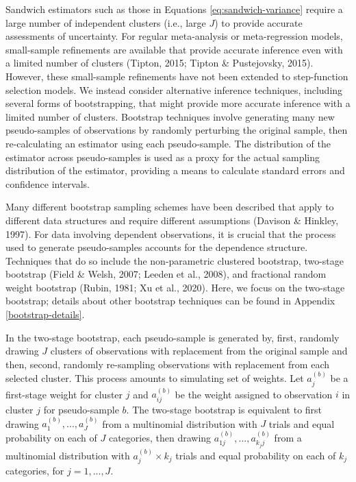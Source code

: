 \documentclass[
  american,
  man, donotrepeattitle,floatsintext]{apa7}
\begin{document}
Sandwich estimators such as those in Equations \eqref{eq:sandwich-variance} require a large number of independent clusters (i.e., large \(J\)) to provide accurate assessments of uncertainty.
For regular meta-analysis or meta-regression models, small-sample refinements are available that provide accurate inference even with a limited number of clusters (Tipton, 2015; Tipton \& Pustejovsky, 2015).
However, these small-sample refinements have not been extended to step-function selection models.
We instead consider alternative inference techniques, including several forms of bootstrapping, that might provide more accurate inference with a limited number of clusters.
Bootstrap techniques involve generating many new pseudo-samples of observations by randomly perturbing the original sample, then re-calculating an estimator using each pseudo-sample.
The distribution of the estimator across pseudo-samples is used as a proxy for the actual sampling distribution of the estimator, providing a means to calculate standard errors and confidence intervals.

Many different bootstrap sampling schemes have been described that apply to different data structures and require different assumptions (Davison \& Hinkley, 1997).
For data involving dependent observations, it is crucial that the process used to generate pseudo-samples accounts for the dependence structure.
Techniques that do so include the non-parametric clustered bootstrap, two-stage bootstrap (Field \& Welsh, 2007; Leeden et al., 2008), and fractional random weight bootstrap (Rubin, 1981; Xu et al., 2020).
Here, we focus on the two-stage bootstrap; details about other bootstrap techniques can be found in Appendix \ref{bootstrap-details}.

In the two-stage bootstrap, each pseudo-sample is generated by, first, randomly drawing \(J\) clusters of observations with replacement from the original sample and then, second, randomly re-sampling observations with replacement from each selected cluster.
This process amounts to simulating set of weights. Let \(a_j^{(b)}\) be a first-stage weight for cluster \(j\) and \(a_{ij}^{(b)}\) be the weight assigned to observation \(i\) in cluster \(j\) for pseudo-sample \(b\).
The two-stage bootstrap is equivalent to first drawing \(a_1^{(b)},...,a_J^{(b)}\) from a multinomial distribution with \(J\) trials and equal probability on each of \(J\) categories, then drawing \(a_{1j}^{(b)},...,a_{k_j j}^{(b)}\) from a multinomial distribution with \(a_j^{(b)} \times k_j\) trials and equal probability on each of \(k_j\) categories, for \(j = 1,...,J\).
\end{document}
